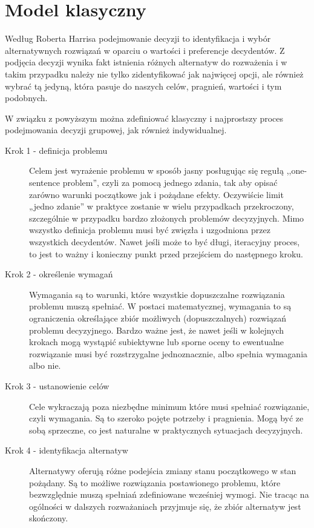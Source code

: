 \section{Model klasyczny}
Według Roberta Harrisa podejmowanie decyzji to identyfikacja i wybór
alternatywnych rozwiązań w oparciu o wartości i preferencje decydentów. Z
podjęcia decyzji wynika fakt istnienia różnych alternatyw do rozważenia i w
takim przypadku należy nie tylko zidentyfikować jak najwięcej opcji, ale również
wybrać tą jedyną, która pasuje do naszych celów, pragnień, wartości i tym
podobnych. 

W związku z powyższym można zdefiniować klasyczny i najprostszy proces 
podejmowania decyzji grupowej, jak również indywidualnej.
\begin{description}
  \item[Krok 1 - definicja problemu] Celem jest wyrażenie problemu w
  sposób jasny posługując się regułą ,,one-sentence problem'', czyli za pomocą
  jednego zdania, tak aby opisać zarówno warunki początkowe jak i pożądane
  efekty. Oczywiście limit „jedno zdanie” w praktyce zostanie w wielu
  przypadkach przekroczony, szczególnie w przypadku bardzo złożonych problemów 
  decyzyjnych. Mimo wszystko definicja problemu musi być zwięzła i uzgodniona
  przez wszystkich decydentów. Nawet jeśli może to być długi, iteracyjny proces,
  to jest to ważny i konieczny punkt przed przejściem do następnego kroku.
  
  \item[Krok 2 - określenie wymagań] Wymagania są to warunki, które wszystkie
  dopuszczalne rozwiązania problemu muszą spełniać. W postaci matematycznej, 
  wymagania to są ograniczenia określające zbiór możliwych (dopuszczalnych) 
  rozwiązań problemu decyzyjnego. Bardzo ważne jest, że nawet jeśli w kolejnych 
  krokach mogą wystąpić subiektywne lub sporne oceny to ewentualne rozwiązanie 
  musi być rozstrzygalne jednoznacznie, albo spełnia wymagania albo nie.
  
  \item[Krok 3 - ustanowienie celów] Cele wykraczają poza niezbędne minimum
  które musi spełniać rozwiązanie, czyli wymagania. Są to szeroko pojęte 
  potrzeby i pragnienia. Mogą być ze sobą sprzeczne, co jest naturalne w 
  praktycznych sytuacjach decyzyjnych.
  
  \item[Krok 4 - identyfikacja alternatyw] Alternatywy oferują różne podejścia
  zmiany stanu początkowego w stan pożądany. Są to możliwe rozwiązania 
  postawionego problemu, które bezwzględnie muszą spełniań zdefiniowane 
  wcześniej wymogi. Nie tracąc na ogólności w dalszych rozważaniach przyjmuje 
  się, że zbiór alternatyw jest skończony.
  

\end{description}
